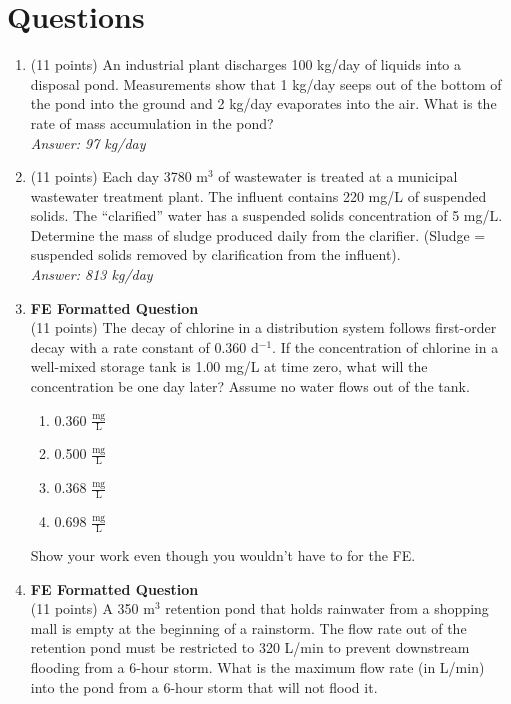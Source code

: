 \documentclass[12pt,letterpaper]{article}
\begin{document}
\section *{Questions}
\begin{enumerate}
\item (11 points) An industrial plant discharges 100 kg/day of liquids into a disposal pond.  Measurements show that 1 kg/day seeps out of the bottom of the pond into the ground and 2 kg/day evaporates into the air.  What is the rate of mass accumulation in the pond?\\
\emph{Answer: 97 kg/day} 

\item 	(11 points) Each day 3780 m$^3$ of wastewater is treated at a municipal wastewater treatment plant.  The influent contains 220 mg/L of suspended solids.  The “clarified” water has a suspended solids concentration of 5 mg/L.  Determine the mass of sludge produced daily from the clarifier. (Sludge = suspended solids removed by clarification from the influent).
\\
\emph{Answer: 813 kg/day}  

\item \textbf{FE Formatted Question}\\
(11 points) The decay of chlorine in a distribution system follows first-order decay with a rate constant of 0.360 d$^{-1}$.  If the concentration of chlorine in a well-mixed storage tank is 1.00 mg/L at time zero, what will the concentration be one day later? Assume no water flows out of the tank.

\begin{enumerate}
\item 0.360 $\mathrm{\frac{mg}{L}}$
\item 0.500 $\mathrm{\frac{mg}{L}}$
\item 0.368 $\mathrm{\frac{mg}{L}}$
\item 0.698 $\mathrm{\frac{mg}{L}}$
\end{enumerate}
Show your work even though you wouldn't have to for the FE.

\item \textbf{FE Formatted Question}\\
(11 points) A 350 $\mathrm{m^3}$ retention pond that holds rainwater from a shopping mall is empty at the beginning of a rainstorm.  The flow rate out of the retention pond must be restricted to 320 L/min to prevent downstream flooding from a 6-hour storm.  What is the maximum flow rate (in L/min) into the pond from a 6-hour storm that will not flood it.


\end{enumerate}
\end{document}
